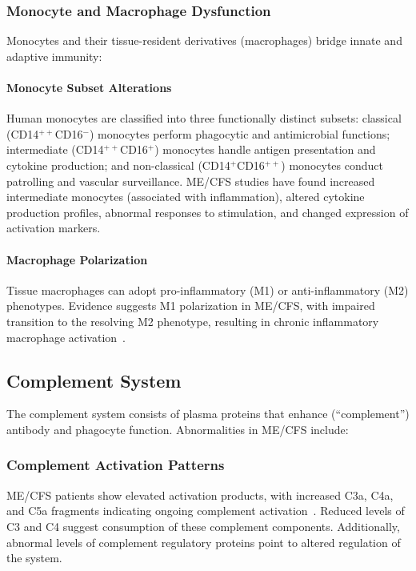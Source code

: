 \subsubsection{Monocyte and Macrophage Dysfunction}

Monocytes and their tissue-resident derivatives (macrophages) bridge innate and adaptive immunity:

\paragraph{Monocyte Subset Alterations}
Human monocytes are classified into three functionally distinct subsets: classical (CD14$^{++}$CD16$^{-}$) monocytes perform phagocytic and antimicrobial functions; intermediate (CD14$^{++}$CD16$^{+}$) monocytes handle antigen presentation and cytokine production; and non-classical (CD14$^{+}$CD16$^{++}$) monocytes conduct patrolling and vascular surveillance. ME/CFS studies have found increased intermediate monocytes (associated with inflammation), altered cytokine production profiles, abnormal responses to stimulation, and changed expression of activation markers.

\paragraph{Macrophage Polarization}
\begin{observation}
\label{obs:macrophage-polarization}
Tissue macrophages can adopt pro-inflammatory (M1) or anti-inflammatory (M2) phenotypes. Evidence suggests M1 polarization in ME/CFS, with impaired transition to the resolving M2 phenotype, resulting in chronic inflammatory macrophage activation~\cite{heng2025mecfs}.
\end{observation}

\subsection{Complement System}
\label{sec:complement}

The complement system consists of plasma proteins that enhance (``complement'') antibody and phagocyte function. Abnormalities in ME/CFS include:

\subsubsection{Complement Activation Patterns}

ME/CFS patients show elevated activation products, with increased C3a, C4a, and C5a fragments indicating ongoing complement activation~\cite{EatonFitch2019}. Reduced levels of C3 and C4 suggest consumption of these complement components. Additionally, abnormal levels of complement regulatory proteins point to altered regulation of the system.

